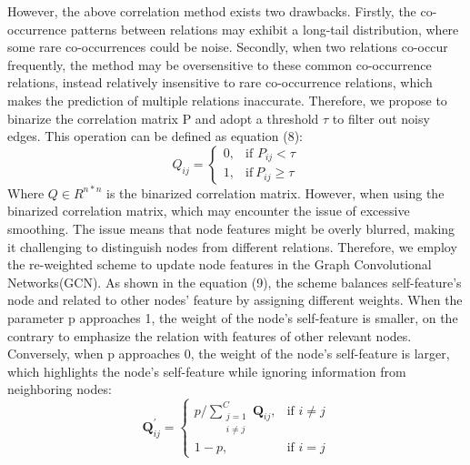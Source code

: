 \documentclass[preprint,12pt]{elsarticle}
\begin{document}
However, the above correlation method exists two drawbacks. Firstly, the co-occurrence patterns between relations may exhibit a long-tail distribution, where some rare co-occurrences could be noise. Secondly, when two relations co-occur frequently, the method may be oversensitive to these common co-occurrence relations, instead relatively insensitive to rare co-occurrence relations, which makes the prediction of multiple relations inaccurate. Therefore, we propose to binarize the correlation matrix P and adopt a threshold $\tau$ to filter out noisy edges. This operation can be defined as equation (8):
\begin{equation}
Q_{ij} = \begin{cases}
{0,} & {\text{if~}P_{ij} < \tau} \\
{1,} & {\text{if}{~P}_{ij} \geq \tau}
\end{cases}\label{eq8}
\end{equation}
Where $Q\in R^{n*n}$ is the binarized correlation matrix. However, when using the binarized correlation matrix, which may encounter the issue of excessive smoothing. The issue means that node features might be overly blurred, making it challenging to distinguish nodes from different relations. Therefore, we employ the re-weighted scheme to update node features in the Graph Convolutional Networks(GCN). As shown in the equation (9), the scheme balances self-feature’s node and related to other nodes’ feature by assigning different weights. When the parameter p approaches 1, the weight of the node's self-feature is smaller, on the contrary to emphasize the relation with features of other relevant nodes. Conversely, when p approaches 0, the weight of the node's self-feature is larger, which highlights the node's self-feature while ignoring information from neighboring nodes:
\begin{equation}
\mathbf{Q}_{ij}^{'} = \begin{cases}
{p/\sum_{\begin{array}{l}
{j = 1} \\
{i \neq j}
\end{array}}^{C}\mathbf{Q}_{ij},} & {\text{if~}i \neq j} \\
{1 - p,} & {\text{if~}i = j}
\end{cases}\label{eq9}
\end{equation}
\end{document}

